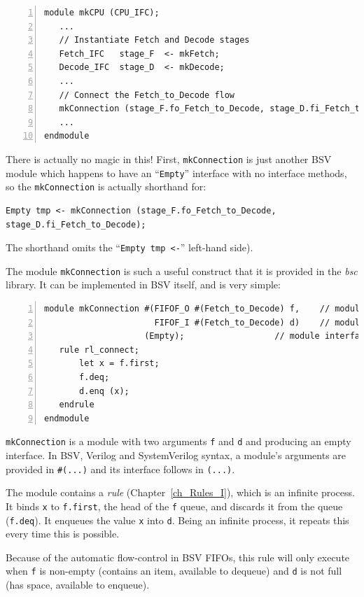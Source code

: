 {\small
\begin{Verbatim}[frame=single, numbers=left]
module mkCPU (CPU_IFC);
   ...
   // Instantiate Fetch and Decode stages
   Fetch_IFC   stage_F  <- mkFetch;
   Decode_IFC  stage_D  <- mkDecode;
   ...
   // Connect the Fetch_to_Decode flow
   mkConnection (stage_F.fo_Fetch_to_Decode, stage_D.fi_Fetch_to_Decode);
   ...
endmodule
\end{Verbatim}
}

There is actually no magic in this!  First, {\tt mkConnection} is just
another BSV module which happens to have an ``\verb|Empty|'' interface
with no interface methods, so the \verb|mkConnection| is actually
shorthand for:

{\small
\begin{Verbatim}[frame=single]
   Empty tmp <- mkConnection (stage_F.fo_Fetch_to_Decode, stage_D.fi_Fetch_to_Decode);
\end{Verbatim}
}

The shorthand omits the ``{\tt Empty~tmp~<-}'' left-hand side).

The module \verb|mkConnection| is such a useful construct that it is
provided in the \emph{bsc} library.  It can be implemented in BSV
itself, and is very simple:

{\small
\begin{Verbatim}[frame=single, numbers=left]
module mkConnection #(FIFOF_O #(Fetch_to_Decode) f,    // module argument
                      FIFOF_I #(Fetch_to_Decode) d)    // module argument
                    (Empty);                  // module interface
   rule rl_connect;
       let x = f.first;
       f.deq;
       d.enq (x);
   endrule
endmodule
\end{Verbatim}
}

{\tt mkConnection} is a module with two arguments {\tt f} and {\tt d}
and producing an empty interface.  In BSV, Verilog and SystemVerilog
syntax, a module's arguments are provided in {\tt \#(...)} and its
interface follows in {\tt (...)}.


The module contains a \emph{rule} (Chapter~\ref{ch_Rules_I}), which is
an infinite process.  It binds {\tt x} to {\tt f.first}, the head of
the {\tt f} queue, and discards it from the queue ({\tt f.deq}).  It
enqueues the value {\tt x} into {\tt d}.  Being an infinite process,
it repeats this every time this is possible.

Because of the automatic flow-control in BSV FIFOs, this rule will
only execute when {\tt f} is non-empty (contains an item, available to
dequeue) and {\tt d} is not full (has space, available to enqueue).

